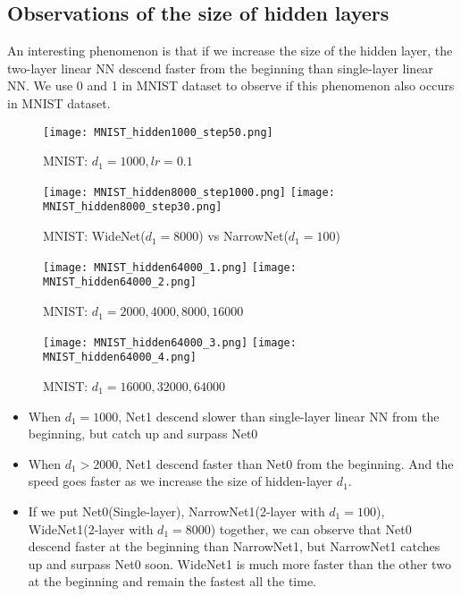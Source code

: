 
\newpage
\subsection{Observations of the size of hidden layers}

An interesting phenomenon is that if we increase the size of the hidden layer, the two-layer linear NN descend faster from the beginning than single-layer linear NN. We use 0 and 1 in MNIST dataset to observe if this phenomenon also occurs in MNIST dataset.

\begin{figure}[H]
	\centering
	\texttt{[image: MNIST\_hidden1000\_step50.png]}
	\caption{MNIST: $d_1 = 1000, lr = 0.1$}
\end{figure}


\begin{figure}[H]
	\centering
	\texttt{[image: MNIST\_hidden8000\_step1000.png]}
	\texttt{[image: MNIST\_hidden8000\_step30.png]}
	\caption{MNIST: WideNet($d_1 = 8000$) vs NarrowNet($d_1 = 100$)}
\end{figure}

\begin{figure}[H]
	\centering
	\texttt{[image: MNIST\_hidden64000\_1.png]}
	\texttt{[image: MNIST\_hidden64000\_2.png]}
	\caption{MNIST: $d_1 = 2000,4000,8000,16000$}
\end{figure}

\begin{figure}[H]
	\centering
	\texttt{[image: MNIST\_hidden64000\_3.png]}
	\texttt{[image: MNIST\_hidden64000\_4.png]}
	\caption{MNIST: $d_1 = 16000, 32000, 64000$}
\end{figure}

\begin{itemize}
	\item When $d_1 = 1000$, Net1 descend slower than single-layer linear NN from the beginning, but catch up and surpass Net0
	\item When $d_1 > 2000$, Net1 descend faster than Net0 from the beginning. And the speed goes faster as we increase the size of hidden-layer $d_1$.
	\item If we put Net0(Single-layer), NarrowNet1(2-layer with $d_1 = 100$), WideNet1(2-layer with $d_1 = 8000$) together, we can observe that Net0 descend faster at the beginning than NarrowNet1, but NarrowNet1 catches up and surpass Net0 soon. WideNet1 is much more faster than the other two at the beginning and remain the fastest all the time.
\end{itemize}

